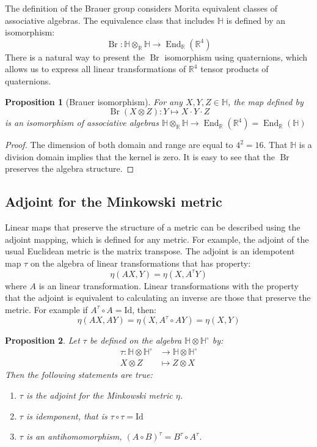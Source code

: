 \documentclass{amsart}
\newcommand{\HH}{\mathbb{H}}
\newcommand{\RR}{\mathbb{R}}
\newcommand{\Br}{\operatorname{Br}}
\newcommand{\End}{\operatorname{End}}
\newtheorem{proposition}{Proposition}
\begin{document}
The definition of the Brauer group considers Morita equivalent classes of associative algebras.
The equivalence class that includes $\HH$ is defined by an isomorphism:
$$ \Br : \HH\otimes_\RR\HH \to \End_\RR(\RR^4) $$
There is a natural way to present the $\Br$ isomorphism using quaternions, which allows us to express all linear transformations of $\RR^4$ tensor products of quaternions.

\begin{proposition}[Brauer isomorphism]
  For any $X,Y,Z\in\HH$, the map defined by
$$ \Br(X\otimes Z) : Y \mapsto X\cdot Y\cdot Z $$
  is an isomorphism of associative algebras $\HH\otimes_\RR\HH \to \End_\RR(\RR^4) = \End_\RR(\HH)$\\
\end{proposition}

\begin{proof}
The dimension of both domain and range are equal to $4^2=16$.
That $\HH$ is a division domain implies that the kernel is zero.
It is easy to see that the $\Br$ preserves the algebra structure.
\end{proof}

\subsection{Adjoint for the Minkowski metric}

Linear maps that preserve the structure of a metric can be described using the adjoint mapping, which is defined for any metric.
For example, the adjoint of the usual Euclidean metric is the matrix transpose.
The adjoint is an idempotent map $\tau$ on the algebra of linear transformations that has property:
$$ \eta(A X, Y) = \eta(X, A^\tau Y) $$
where $A$ is an linear transformation.
Linear transformations with the property that the adjoint is equivalent to calculating an inverse are those that preserve the metric.
For example if $A^\tau\circ A = \textrm{Id}$, then:
$$ \eta(A X, A Y) = \eta(X, A^\tau\circ A Y) = \eta(X, Y) $$

\begin{proposition}
  \label{prop-adjoint}
  Let $\tau$ be defined on the algebra $\HH\otimes\HH^\circ$ by:
  \begin{align*}
    \tau : \HH\otimes\HH^\circ &\to\HH\otimes\HH^\circ \\
              X \otimes Z &\mapsto Z \otimes X
  \end{align*}
  Then the following statements are true:
  \begin{enumerate}
    \item $\tau$ is the adjoint  for the Minkowski metric $\eta$.
    \item $\tau$ is idemponent, that is $\tau \circ \tau = \mathrm{Id}$
    \item $\tau$ is an antihomomorphism, $(A\circ B)^\tau = B^\tau \circ A^\tau$.
  \end{enumerate}
\end{proposition}
\end{document}
